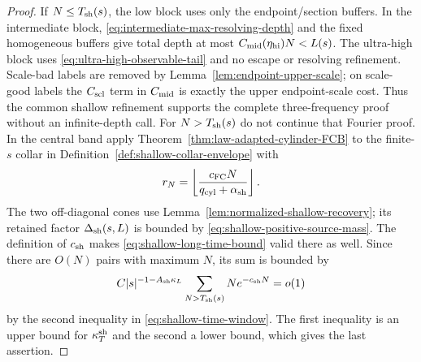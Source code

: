 \documentclass[11pt]{article}
\begin{document}
\begin{proof}
If $N\le T_{\rm sh}(s)$, the low block uses only the endpoint/section
buffers.  In the intermediate block, \eqref{eq:intermediate-max-resolving-depth}
and the fixed homogeneous buffers give total depth at most
$C_{\rm mid}(\eta_{\rm hi})N<L(s)$.  The ultra-high block uses
\eqref{eq:ultra-high-observable-tail} and no escape or resolving refinement.
Scale-bad labels are removed by Lemma~\ref{lem:endpoint-upper-scale}; on
scale-good labels the $C_{\rm scl}$ term in $C_{\rm mid}$ is exactly the
upper endpoint-scale cost.  Thus the common shallow refinement supports the complete three-frequency
proof without an infinite-depth call.  For $N>T_{\rm sh}(s)$ do not continue
that Fourier proof.  In the central band apply
Theorem~\ref{thm:law-adapted-cylinder-FCB} to the finite-$s$ collar in
Definition~\ref{def:shallow-collar-envelope} with
\[
 r_N=\left\lfloor\frac{c_{\rm FC}N}
 {q_{\rm cyl}+\alpha_{\rm sh}}\right\rfloor .
\]
The two off-diagonal cones use
Lemma~\ref{lem:normalized-shallow-recovery}; its retained factor
$\Delta_{\rm sh}(s,L)$ is bounded by
\eqref{eq:shallow-positive-source-mass}.  The definition of $c_{\rm sh}$ makes
\eqref{eq:shallow-long-time-bound} valid there as well.  Since there are $O(N)$ pairs
with maximum $N$, its sum is bounded by
\[
 C|s|^{-1-A_{\rm sh}\kappa_L}
 \sum_{N>T_{\rm sh}(s)}Ne^{-c_{\rm sh}N}=o(1)
\]
by the second inequality in \eqref{eq:shallow-time-window}.  The first
inequality is an upper bound for $\kappa_T^{\rm sh}$ and the second a lower
bound, which gives the last assertion.
\end{proof}
\end{document}

